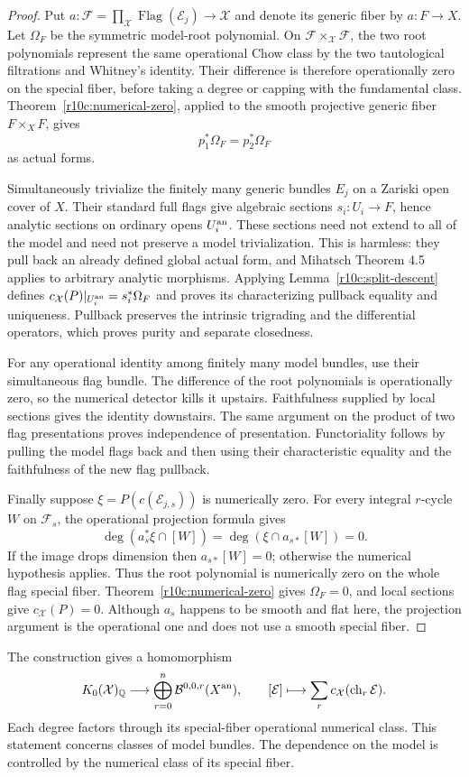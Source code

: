 \begin{proof}
Put $a:\mathcal F=\prod_{\mathcal X}\operatorname{Flag}(\mathcal E_j)
\to\mathcal X$ and denote its generic fiber by $a:F\to X$.
Let $\Omega_F$ be the symmetric model-root polynomial.  On
$\mathcal F\times_{\mathcal X}\mathcal F$, the two root polynomials
represent the same operational Chow class by the two tautological
filtrations and Whitney's identity.  Their difference is therefore
operationally zero on the special fiber, before taking a degree or
capping with the fundamental class.  Theorem~\ref{r10c:numerical-zero},
applied to the smooth projective generic fiber $F\times_XF$, gives
\[
                         p_1^*\Omega_F=p_2^*\Omega_F
\]
as actual forms.

Simultaneously trivialize the finitely many generic bundles $E_j$ on
a Zariski open cover of $X$.  Their standard full flags give algebraic
sections $s_i:U_i\to F$, hence analytic sections on ordinary opens
$U_i^{\rm an}$.  These sections need not extend to all of the model
and need not preserve a model trivialization.  This is harmless:
they pull back an already defined global actual form, and Mihatsch
Theorem 4.5 applies to arbitrary analytic morphisms.  Applying
Lemma~\ref{r10c:split-descent} defines
$c_{\mathcal X}(P)|_{U_i^{\rm an}}=s_i^*\Omega_F$ and proves its
characterizing pullback equality and uniqueness.  Pullback preserves
the intrinsic trigrading and the differential operators, which proves
purity and separate closedness.

For any operational identity among finitely many model bundles, use
their simultaneous flag bundle.  The difference of the root polynomials
is operationally zero, so the numerical detector kills it upstairs.
Faithfulness supplied by local sections gives the identity downstairs.
The same argument on the product of two flag presentations proves
independence of presentation.  Functoriality follows by pulling the
model flags back and then using their characteristic equality and the
faithfulness of the new flag pullback.

Finally suppose $\xi=P(c(\mathcal E_{j,s}))$ is numerically zero.
For every integral $r$-cycle $W$ on $\mathcal F_s$, the operational
projection formula gives
\[
                 \deg(a_s^*\xi\cap[W])=
                 \deg(\xi\cap a_{s*}[W])=0.
\]
If the image drops dimension then $a_{s*}[W]=0$; otherwise the numerical
hypothesis applies.  Thus the root polynomial is numerically zero on
the whole flag special fiber.  Theorem~\ref{r10c:numerical-zero}
gives $\Omega_F=0$, and local sections give $c_{\mathcal X}(P)=0$.
Although $a_s$ happens to be smooth and flat here, the projection
argument is the operational one and does not use a smooth special fiber.
\end{proof}

The construction gives a homomorphism
\[
 K_0(\mathcal X)_{\mathbb Q}\longrightarrow
      \bigoplus_{r=0}^{n}\mathcal B^{0,0,r}(X^{\rm an}),
                  \qquad [\mathcal E]\longmapsto
                       \sum_r c_{\mathcal X}(\operatorname{ch}_r\mathcal E).
\]
Each degree factors through its special-fiber operational numerical
class.  This statement concerns classes of model bundles.  The dependence on the model is controlled by the numerical class of its special fiber.
